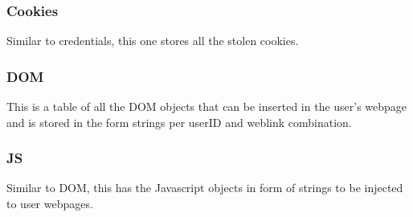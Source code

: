 \subsubsection{Cookies}
Similar to credentials, this one stores all the stolen cookies.

\subsubsection{DOM}
This is a table of all the DOM objects that can be inserted in the user's webpage and is stored in the form strings per userID and weblink combination.

\subsubsection{JS}
Similar to DOM, this has the Javascript objects in form of strings to be injected to user webpages.